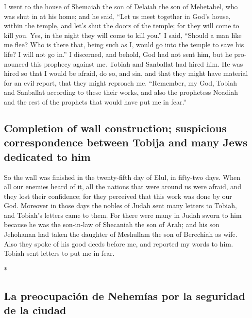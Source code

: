\begin{paracol}{2}
\begin{otherlanguage}{english}
 I went to the house of Shemaiah the son of Delaiah the
son of Mehetabel, who was shut in at his home; and he said, ``Let us
meet together in God's house, within the temple, and let's shut the
doors of the temple; for they will come to kill you. Yes, in the night
they will come to kill you.''  I said, ``Should a man
like me flee? Who is there that, being such as I, would go into the
temple to save his life? I will not go in.''  I
discerned, and behold, God had not sent him, but he pronounced this
prophecy against me. Tobiah and Sanballat had hired him. 
He was hired so that I would be afraid, do so, and sin, and that they
might have material for an evil report, that they might reproach me.
 ``Remember, my God, Tobiah and Sanballat according to
these their works, and also the prophetess Noadiah and the rest of the
prophets that would have put me in fear.''

\hypertarget{completion-of-wall-construction-suspicious-correspondence-between-tobija-and-many-jews-dedicated-to-him}{%
\subsection{Completion of wall construction; suspicious correspondence
between Tobija and many Jews dedicated to
him}\label{completion-of-wall-construction-suspicious-correspondence-between-tobija-and-many-jews-dedicated-to-him}}

 So the wall was finished in the twenty-fifth day of
Elul, in fifty-two days.  When all our enemies heard of
it, all the nations that were around us were afraid, and they lost their
confidence; for they perceived that this work was done by our God.
 Moreover in those days the nobles of Judah sent many
letters to Tobiah, and Tobiah's letters came to them. 
For there were many in Judah sworn to him because he was the son-in-law
of Shecaniah the son of Arah; and his son Jehohanan had taken the
daughter of Meshullam the son of Berechiah as wife.  Also
they spoke of his good deeds before me, and reported my words to him.
Tobiah sent letters to put me in fear.

\end{otherlanguage}

\switchcolumn[0]*

\hypertarget{la-preocupaciuxf3n-de-nehemuxedas-por-la-seguridad-de-la-ciudad}{%
\subsection{La preocupación de Nehemías por la seguridad de la
ciudad}\label{la-preocupaciuxf3n-de-nehemuxedas-por-la-seguridad-de-la-ciudad}}


\end{paracol}
